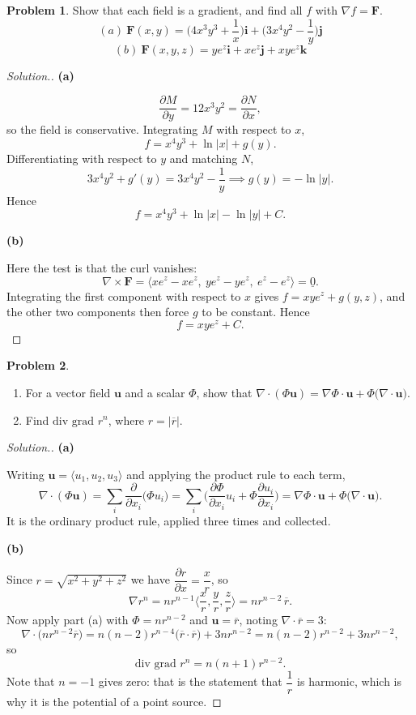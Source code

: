 \documentclass[11pt,a4paper]{article}
\theoremstyle{definition}
\newtheorem{problemx}{Problem}[subsection]
\newenvironment{problem}{\begin{problemx}}{\end{problemx}}
\newenvironment{solution}
  {\renewcommand{\qedsymbol}{}\begin{proof}[\textit{Solution}.]}
  {\end{proof}}
\newcommand{\subhead}[1]{%
  \par\medskip\noindent\textbf{#1}\par\nobreak\smallskip}
\begin{document}
\begin{problem}
Show that each field is a gradient, and find all $f$ with $\nabla f = \textbf{F}$.
$$(a)\ \textbf{F}(x,y) = \Big(4x^3y^3+\frac1x\Big)\textbf{i}
+ \Big(3x^4y^2-\frac1y\Big)\textbf{j}$$
$$(b)\ \textbf{F}(x,y,z) = ye^z\textbf{i} + xe^z\textbf{j} + xye^z\textbf{k}$$
\end{problem}
\begin{solution}
\subhead{(a)}
$$\frac{\partial M}{\partial y} = 12x^3y^2 = \frac{\partial N}{\partial x},$$
so the field is conservative. Integrating $M$ with respect to $x$,
$$f = x^4y^3 + \ln\left|x\right| + g(y).$$
Differentiating with respect to $y$ and matching $N$,
$$3x^4y^2 + g'(y) = 3x^4y^2 - \frac1y \implies g(y) = -\ln\left|y\right| .$$
Hence
$$f = x^4y^3 + \ln\left|x\right| - \ln\left|y\right| + C .$$

\subhead{(b)}
Here the test is that the curl vanishes:
$$\nabla\times\textbf{F}
= \big\langle xe^z-xe^z,\ ye^z-ye^z,\ e^z-e^z\big\rangle = \underline{0}.$$
Integrating the first component with respect to $x$ gives
$f = xye^z + g(y,z)$, and the other two components then force $g$ to be
constant. Hence
$$f = xye^z + C .$$
\end{solution}

\begin{problem}
\begin{enumerate}
\item[(a)] For a vector field $\textbf{u}$ and a scalar $\Phi$, show that
$\nabla\cdot(\Phi\textbf{u}) = \nabla\Phi\cdot\textbf{u}
+ \Phi\big(\nabla\cdot\textbf{u}\big)$.
\item[(b)] Find $\text{div grad } r^n$, where $r = \left|\overline{r}\right|$.
\end{enumerate}
\end{problem}
\begin{solution}
\subhead{(a)}
Writing $\textbf{u} = \langle u_1,u_2,u_3\rangle$ and applying the product rule
to each term,
$$\nabla\cdot(\Phi\textbf{u})
= \sum_{i}\frac{\partial}{\partial x_i}\big(\Phi u_i\big)
= \sum_i\Big(\frac{\partial\Phi}{\partial x_i}u_i
+ \Phi\frac{\partial u_i}{\partial x_i}\Big)
= \nabla\Phi\cdot\textbf{u} + \Phi\big(\nabla\cdot\textbf{u}\big).$$
It is the ordinary product rule, applied three times and collected.

\subhead{(b)}
Since $r = \sqrt{x^2+y^2+z^2}$ we have
$\dfrac{\partial r}{\partial x} = \dfrac{x}{r}$, so
$$\nabla r^n = nr^{n-1}\Big\langle\frac xr,\frac yr,\frac zr\Big\rangle
= nr^{n-2}\,\overline{r}.$$
Now apply part (a) with $\Phi = nr^{n-2}$ and $\textbf{u} = \overline{r}$,
noting $\nabla\cdot\overline{r} = 3$:
$$\nabla\cdot\big(nr^{n-2}\overline{r}\big)
= n(n-2)r^{n-4}\big(\overline{r}\cdot\overline{r}\big) + 3nr^{n-2}
= n(n-2)r^{n-2} + 3nr^{n-2},$$
so
$$\text{div grad } r^n = n(n+1)r^{n-2}.$$
Note that $n = -1$ gives zero: that is the statement that $\dfrac1r$ is
harmonic, which is why it is the potential of a point source.
\end{solution}
\end{document}
